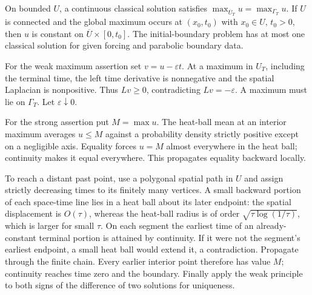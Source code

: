 \begin{theorem}
On bounded $U$, a continuous classical solution satisfies
$\max_{\overline U_T}u=\max_{\Gamma_T}u$.
If $U$ is connected and the global maximum occurs at $(x_0,t_0)$
with $x_0\in U$, $t_0>0$, then $u$ is constant on
$\overline U\times[0,t_0]$.
The initial-boundary problem has at most one classical solution for
given forcing and parabolic boundary data.
\end{theorem}
\begin{expandedproof}
For the weak maximum assertion set $v=u-\varepsilon t$.
At a maximum in $U_T$, including the terminal time, the left time
derivative is nonnegative and the spatial Laplacian is nonpositive.
Thus $Lv\geq0$, contradicting $Lv=-\varepsilon$.
A maximum must lie on $\Gamma_T$. Let $\varepsilon\downarrow0$.

For the strong assertion put $M=\max u$.
The heat-ball mean at an interior maximum averages $u\leq M$ against
a probability density strictly positive except on a negligible axis.
Equality forces $u=M$ almost everywhere in the heat ball; continuity
makes it equal everywhere. This propagates equality backward locally.

To reach a distant past point, use a polygonal spatial path in $U$
and assign strictly decreasing times to its finitely many vertices.
A small backward portion of each space-time line lies in a heat ball
about its later endpoint: the spatial displacement is $O(\tau)$,
whereas the heat-ball radius is of order
$\sqrt{\tau\log(1/\tau)}$, which is larger for small $\tau$.
On each segment the earliest time of an already-constant terminal
portion is attained by continuity. If it were not the segment's
earliest endpoint, a small heat ball would extend it, a contradiction.
Propagate through the finite chain. Every earlier interior point
therefore has value $M$; continuity reaches time zero and the boundary.
Finally apply the weak principle to both signs of the difference
of two solutions for uniqueness.
\end{expandedproof}
\Needspace{45mm}

